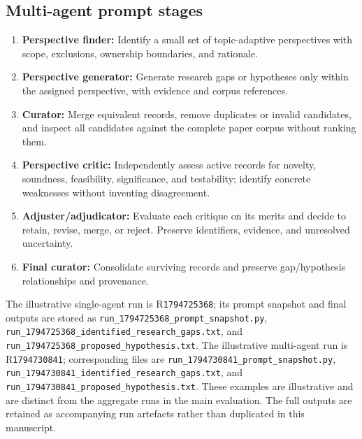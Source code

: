 \documentclass[sigconf,review,anonymous=false]{acmart}
\begin{document}
\subsection{Multi-agent prompt stages}
\begin{enumerate}[leftmargin=*]
  \item \textbf{Perspective finder:} Identify a small set of topic-adaptive perspectives with scope, exclusions, ownership boundaries, and rationale.
  \item \textbf{Perspective generator:} Generate research gaps or hypotheses only within the assigned perspective, with evidence and corpus references.
  \item \textbf{Curator:} Merge equivalent records, remove duplicates or invalid candidates, and inspect all candidates against the complete paper corpus without ranking them.
  \item \textbf{Perspective critic:} Independently assess active records for novelty, soundness, feasibility, significance, and testability; identify concrete weaknesses without inventing disagreement.
  \item \textbf{Adjuster/adjudicator:} Evaluate each critique on its merits and decide to retain, revise, merge, or reject. Preserve identifiers, evidence, and unresolved uncertainty.
  \item \textbf{Final curator:} Consolidate surviving records and preserve gap/hypothesis relationships and provenance.
\end{enumerate}

The illustrative single-agent run is R\texttt{1794725368}; its prompt snapshot and final outputs are stored as \texttt{run\_1794725368\_prompt\_snapshot.py}, \texttt{run\_1794725368\_identified\_research\_gaps.txt}, and \texttt{run\_1794725368\_proposed\_hypothesis.txt}. The illustrative multi-agent run is R\texttt{1794730841}; corresponding files are \texttt{run\_1794730841\_prompt\_snapshot.py}, \texttt{run\_1794730841\_identified\_research\_gaps.txt}, and \texttt{run\_1794730841\_proposed\_hypothesis.txt}. These examples are illustrative and are distinct from the aggregate runs in the main evaluation. The full outputs are retained as accompanying run artefacts rather than duplicated in this manuscript.
\end{document}
